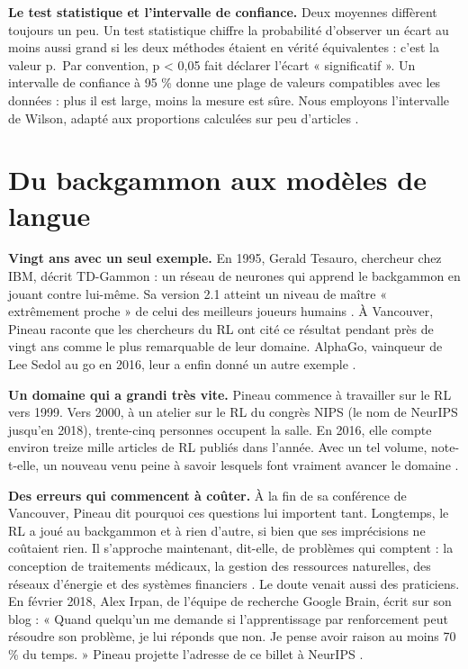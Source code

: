 \documentclass[11pt,a4paper]{article}
\begin{document}
\textbf{Le test statistique et l'intervalle de confiance.} Deux moyennes
diffèrent toujours un peu. Un test statistique chiffre la probabilité
d'observer un écart au moins aussi grand si les deux méthodes étaient en
vérité équivalentes : c'est la valeur p.~Par convention, p \textless{}
0,05 fait déclarer l'écart « significatif ». Un intervalle de confiance
à 95 \% donne une plage de valeurs compatibles avec les données : plus
il est large, moins la mesure est sûre. Nous employons l'intervalle de
Wilson, adapté aux proportions calculées sur peu d'articles
\autocite{wilson1927probable}.

\section{Du backgammon aux modèles de
langue}\label{du-backgammon-aux-moduxe8les-de-langue}

\textbf{Vingt ans avec un seul exemple.} En 1995, Gerald Tesauro,
chercheur chez IBM, décrit TD-Gammon : un réseau de neurones qui apprend
le backgammon en jouant contre lui-même. Sa version 2.1 atteint un
niveau de maître « extrêmement proche » de celui des meilleurs joueurs
humains \autocite{tesauro1995tdgammon}. À Vancouver, Pineau raconte que
les chercheurs du RL ont cité ce résultat pendant près de vingt ans
comme le plus remarquable de leur domaine. AlphaGo, vainqueur de Lee
Sedol au go en 2016, leur a enfin donné un autre exemple
\autocite{silver2016alphago,pineau2018iclr}.

\textbf{Un domaine qui a grandi très vite.} Pineau commence à travailler
sur le RL vers 1999. Vers 2000, à un atelier sur le RL du congrès NIPS
(le nom de NeurIPS jusqu'en 2018), trente-cinq personnes occupent la
salle. En 2016, elle compte environ treize mille articles de RL publiés
dans l'année. Avec un tel volume, note-t-elle, un nouveau venu peine à
savoir lesquels font vraiment avancer le domaine
\autocite{pineau2018iclr}.

\textbf{Des erreurs qui commencent à coûter.} À la fin de sa conférence
de Vancouver, Pineau dit pourquoi ces questions lui importent tant.
Longtemps, le RL a joué au backgammon et à rien d'autre, si bien que ses
imprécisions ne coûtaient rien. Il s'approche maintenant, dit-elle, de
problèmes qui comptent : la conception de traitements médicaux, la
gestion des ressources naturelles, des réseaux d'énergie et des systèmes
financiers \autocite{pineau2018iclr}. Le doute venait aussi des
praticiens. En février 2018, Alex Irpan, de l'équipe de recherche Google
Brain, écrit sur son blog : « Quand quelqu'un me demande si
l'apprentissage par renforcement peut résoudre son problème, je lui
réponds que non. Je pense avoir raison au moins 70 \% du temps. » Pineau
projette l'adresse de ce billet à NeurIPS
\autocite{irpan2018rlhard,pineau2018neurips}.
\end{document}

